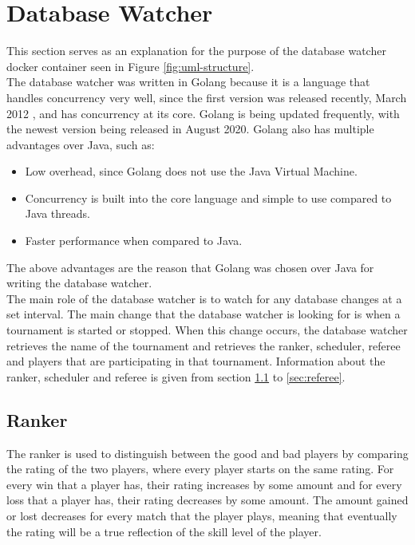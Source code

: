 \documentclass[a4paper, 12pt]{report}
\begin{document}
\section{Database Watcher}

This section serves as an explanation for the purpose of the database watcher
docker container seen in Figure \ref{fig:uml-structure}. \\

The database watcher was written in Golang because it is a language that handles
concurrency very well, since the first version was released recently, March 2012
\cite{golang}, and has concurrency at its core. Golang is being updated frequently,
with the newest version being released in August 2020. Golang also has multiple
advantages over Java, such as:
\begin{itemize}
	\item Low overhead, since Golang does not use the Java Virtual Machine.
	\item Concurrency is built into the core language and simple to use compared
	to Java threads.
	\item Faster performance when compared to Java.
\end{itemize}
The above advantages are the reason that Golang was chosen over Java for writing
the database watcher. \\

The main role of the database watcher is to watch for any database changes at a
set interval. The main change that the database watcher is looking for is when a
tournament is started or stopped. When this change occurs, the database watcher
retrieves the name of the tournament and retrieves the ranker, scheduler, referee
and players that are participating in that tournament. Information about the
ranker, scheduler and referee is given from section \ref{sec:ranker} to
\ref{sec:referee}.

\subsection{Ranker}
\label{sec:ranker}

The ranker is used to distinguish between the good and bad players by comparing
the rating of the two players, where every player starts on the same rating.
For every win that a player has, their rating increases by some amount and
for every loss that a player has, their rating decreases by some amount. The
amount gained or lost decreases for every match that the player plays, meaning
that eventually the rating will be a true reflection of the skill level of the
player. \\
\end{document}
